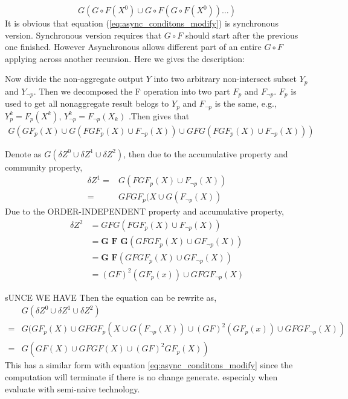 \begin{appendix}
\onecolumn
\begin{equation}
\label{eq:async_conditons_modify}
G(G\circ F(X^0)\cup G\circ F(G \circ F(X^0))\ldots)
\end{equation}
It is obvious that equation (\ref{eq:async_conditons_modify}) is synchronous version. Synchronous version requires that $G\circ F$ should start after the previous one finished.
However Asynchronous allows different part of an entire $G\circ F$ applying across another recursion.
Here we gives the description:
\begin{definition}
Now divide the non-aggregate output $Y$ into two arbitrary non-intersect subset $Y_p$ and $Y_{\neg p}$. Then we decomposed the F operation into two part $F_p$ and $F_{\neg p}$. $F_p$ is used to get all  nonaggregate result belogs to $Y_{p}$ and $F_{\neg p}$ is the same, e.g., $Y^k_p=F_p(X^k)$, $Y^k_{\neg p}=F_{\neg p}(X_k)$ .Then gives that
\begin{align}
G(GF_p(X)\cup G (F G  F_p(X)\cup F_{\neg p}(X)) \cup
G F G(F G  F_p(X)\cup F_{\neg p}(X)) )
\end{align}
\end{definition}
 Denote as $G(\delta Z^0\cup \delta Z^1\cup \delta Z^2)$, then due to the accumulative property and community property,
 \begin{align}
			\delta Z^1=&G (F G  F_p(X)\cup F_{\neg p}(X))\\
			=&GF G  F_p(X\cup G(F_{\neg p}(X))
 \end{align}
 Due to the ORDER-INDEPENDENT property and accumulative property,
  \begin{align}
\delta Z^2 &=G F G(F G  F_p(X)\cup F_{\neg p}(X))\\
&=\textbf{G F G}(G F G  F_p(X)\cup G F_{\neg p}(X))\\
 &=\textbf{G F}(G F G  F_p(X)\cup G F_{\neg p}(X))\\
 &=(GF)^2(GF_{p}(x))\cup GFGF_{\neg p}(X)
 \end{align}

sUNCE WE HAVE
Then  the equation can  be rewrite as,
\begin{align}
&G(\delta Z^0\cup \delta Z^1\cup \delta Z^2)\\
=&G(GF_{p}(X)\cup GF G  F_p(X\cup G(F_{\neg p}(X))\cup (GF)^2(GF_{p}(x))\cup GFGF_{\neg p}(X))\\
=&G(GF(X)\cup GFGF(X)\cup (GF)^2GF_{p}(X))
\end{align}
This has a similar form with equation \ref{eq:async_conditons_modify} since the computation will terminate if there is no change generate. especialy when evaluate with semi-naive technology. 




\end{appendix}
